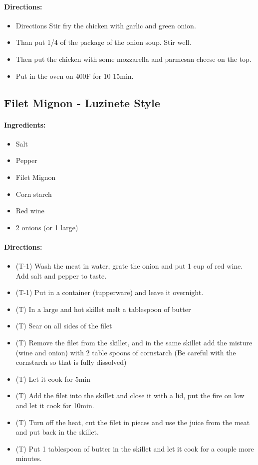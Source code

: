 \documentclass{article}
\begin{document}
\paragraph{Directions:}
\begin{itemize}
    \item Directions Stir fry the chicken with garlic and green onion.
    \item Than put 1/4 of the package of the onion soup. Stir well.
    \item Then put the chicken with some mozzarella and parmesan cheese on the top.
    \item Put in the oven on 400F for 10-15min.
\end{itemize}

\subsection{Filet Mignon - Luzinete Style}

\paragraph{Ingredients:}
\begin{itemize}
    \item Salt
    \item Pepper
    \item Filet Mignon
    \item Corn starch
    \item Red wine
    \item 2 onions (or 1 large)
\end{itemize}

\paragraph{Directions:}
\begin{itemize}
    \item (T-1) Wash the meat in water, grate the onion and put 1 cup of red wine. Add salt and pepper to taste.
    \item (T-1) Put in a container (tupperware) and leave it overnight.
    \item (T) In a large and hot skillet melt a tablespoon of butter
    \item (T) Sear on all sides of the filet
    \item (T) Remove the filet from the skillet, and in the same skillet add the misture (wine and onion) with 2 table spoons of cornstarch (Be careful with the cornstarch so that is fully dissolved)
    \item (T) Let it cook for 5min
    \item (T) Add the filet into the skillet and close it with a lid, put the fire on low and let it cook for 10min.
    \item (T) Turn off the heat, cut the filet in pieces and use the juice from the meat and put back in the skillet.
    \item (T) Put 1 tablespoon of butter in the skillet and let it cook for a couple more minutes.
\end{itemize}
\end{document}
